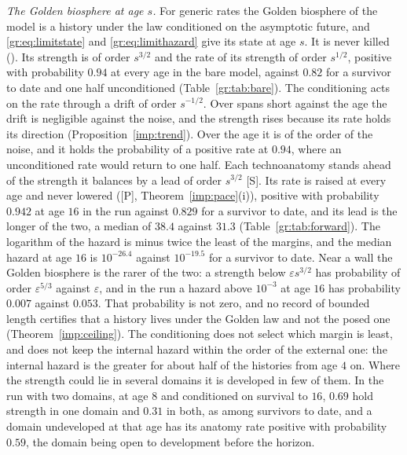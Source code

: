 \emph{The Golden biosphere at age $s$.} For generic rates the Golden
biosphere of the model is a history under the law conditioned on the
asymptotic future, and \eqref{gr:eq:limitstate} and \eqref{gr:eq:limithazard} give its
state at age $s$. It is never killed (\cite{GoldenSurvivorship}). Its strength is of order
$s^{3/2}$ and the rate of its strength of order $s^{1/2}$, positive with
probability $0.94$ at every age in the bare model, against $0.82$
for a survivor to date and one half unconditioned
(Table~\ref{gr:tab:bare}). The conditioning acts on the rate through a
drift of order $s^{-1/2}$. Over spans short against the age the drift is
negligible against the noise, and the strength rises because its rate
holds its direction (Proposition~\ref{imp:trend}). Over the age it is of the order of the
noise, and it holds the probability of a positive rate at $0.94$,
where an unconditioned rate would return to one half. Each technoanatomy
stands ahead of the strength it balances by a lead of order $s^{3/2}$
[S]. Its rate is raised at every age and never lowered ([P], Theorem~\ref{imp:pace}(i)),
positive with probability $0.942$ at age $16$ in the run against
$0.829$ for a survivor to date, and its lead is the longer of the
two, a median of $38.4$ against $31.3$
(Table~\ref{gr:tab:forward}). The logarithm of the hazard is minus twice the
least of the margins, and the median hazard at age $16$ is
$10^{-26.4}$ against $10^{-19.5}$ for a survivor to date. Near a
wall the Golden biosphere is the rarer of the two: a strength below
$\varepsilon s^{3/2}$ has probability of order $\varepsilon^{5/3}$
against $\varepsilon$, and in the run a hazard above $10^{-3}$ at age
$16$ has probability $0.007$ against $0.053$. That
probability is not zero, and no record of bounded length certifies that
a history lives under the Golden law and not the posed one (Theorem~\ref{imp:ceiling}).
The conditioning does not select which margin is least, and does not
keep the internal hazard within the order of the external one: the
internal hazard is the greater for about half of the histories from age
$4$ on. Where the strength could lie in several domains it is developed
in few of them. In the run with two domains, at age $8$ and conditioned
on survival to $16$, $0.69$ hold strength in one domain and
$0.31$ in both, as among survivors to date, and a domain
undeveloped at that age has its anatomy rate positive with probability
$0.59$, the domain being open to development before the horizon.
